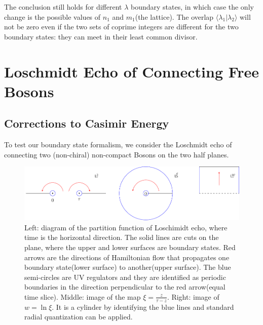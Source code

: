 \documentclass{article}
\begin{document}
The conclusion still holds for different $\lambda$ boundary states, in which case the only change is the possible values of $n_1$ and $m_1$(the lattice). The overlap $\langle \lambda_1 | \lambda_2 \rangle $ will not be zero even if the two sets of coprime integers are different for the two boundary states: they can meet in their least common divisor. 




\section{Loschmidt Echo of Connecting Free Bosons}
\subsection{Corrections to Casimir Energy}

To test our boundary state formalism, we consider the Loschmidt echo of connecting two (non-chiral) non-compact Bosons on the two half planes. 


\begin{figure}[h]
\centering
\includegraphics[width=\textwidth]{fig_H-tau}
\caption{Left: diagram of the partition function of Loschimidt echo, where time is the horizontal direction. The solid lines are cuts on the plane, where the upper and lower surfaces are boundary states. Red arrows are the directions of Hamiltonian flow that propagates one boundary state(lower surface) to another(upper surface). The blue semi-circles are UV regulators and they are identified as periodic boundaries in the direction perpendicular to the red arrow(equal time slice). Middle: image of the map $\xi = \frac{z}{\tau - z}$. Right: image of $w = \ln \xi$. It is a cylinder by identifying the blue lines and standard radial quantization can be applied. }
\label{fig:H-tau}
\end{figure}
\end{document}
